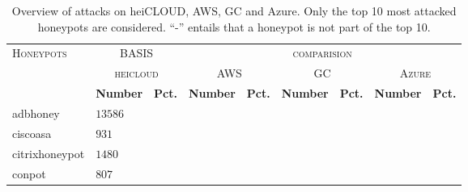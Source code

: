 \begin{table}
    \centering
    \caption[Overview of attacks on cloud providers]{Overview of attacks on heiCLOUD, AWS, GC and Azure. Only the top 10 most attacked honeypots are considered. \enquote{-} entails that a honeypot is not part of the top 10.}
    \begin{tabularx}{\linewidth}{l|XX|XXXXXX}
        \toprule
        \textsc{Honeypots}                       & \multicolumn{2}{c|}{BASIS}                  & \multicolumn{6}{c}{\textsc{comparision}}                                                                                                                                                        \\
                                                 & \multicolumn{2}{c|}{\textsc{heicloud}} & \multicolumn{2}{c}{\textsc{AWS}}         & \multicolumn{2}{c}{\textsc{GC}} & \multicolumn{2}{c}{\textsc{Azure}}                                                                                 \\
                                                 & \textbf{Number}                       & \textbf{Pct.}                      & \textbf{Number}                 & \textbf{Pct.}                & \textbf{Number} & \textbf{Pct.} & \textbf{Number} & \textbf{Pct.} \\
        \hline
        adbhoney \cite{adbhoney2021}             & $13586$                               &                                          &                                 &                                    &                 &                     &                 &                     \\
        ciscoasa \cite{cymmetria2018}            & $931$                                 &                                          &                                 &                                    &                 &                     &                 &                     \\
        citrixhoneypot \cite{citrixhoneypot2020} & $1480$                                &                                          &                                 &                                    &                 &                     &                 &                     \\
        conpot \cite{conpot2021}                 & $807$                                 &                                          &                                 &                                    &                 &                     &                 &                     \\

\end{tabularx}
\end{table}
